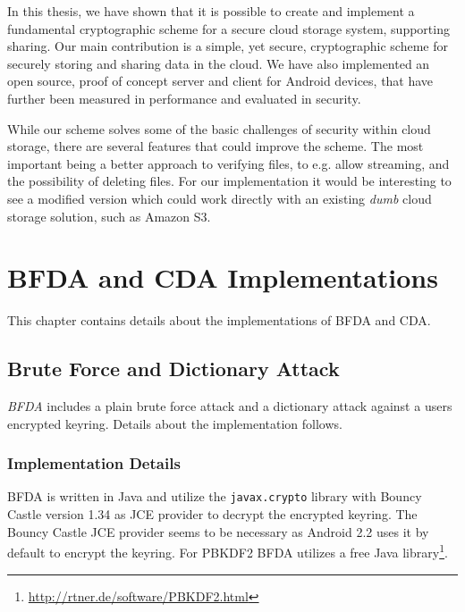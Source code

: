\documentclass[pdftex,english,10pt,b5paper,twoside]{book}
\begin{document}
In this thesis, we have shown that it is possible to create and implement a
fundamental cryptographic scheme for a secure cloud storage system, supporting
sharing. Our main contribution is a simple, yet secure, cryptographic scheme
for securely storing and sharing data in the cloud. We have also implemented an
open source, proof of concept server and client for Android devices, that have
further been measured in performance and evaluated in security.

While our scheme solves some of the basic challenges of security within cloud
storage, there are several features that could improve the scheme. The most
important being a better approach to verifying files, to e.g. allow streaming,
and the possibility of deleting files. For our implementation it would be
interesting to see a modified version which could work directly with
an existing \emph{dumb} cloud storage solution, such as Amazon S3.



\appendix
\appendixpage
\addappheadtotoc
\chapter{\ac{BFDA} and \ac{CDA} Implementations}
\label{ap:other}

This chapter contains details about the implementations of \ac{BFDA} and
\ac{CDA}.

\section{Brute Force and Dictionary Attack}

\emph{\ac{BFDA}} includes a plain brute force attack and a dictionary attack against
a users encrypted keyring. Details about the implementation follows.

\subsection{Implementation Details}

\ac{BFDA} is written in Java and utilize the \texttt{javax.crypto} library with
Bouncy Castle version 1.34 as JCE provider to decrypt the encrypted keyring.
The Bouncy Castle JCE provider seems to be necessary as Android 2.2 uses it by
default to encrypt the keyring. For \ac{PBKDF2} \ac{BFDA} utilizes a free 
Java library\footnote{\url{http://rtner.de/software/PBKDF2.html}}.
\end{document}
